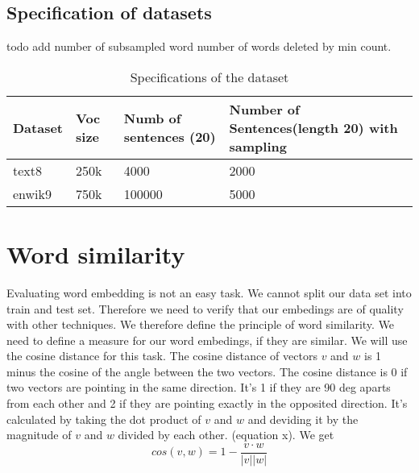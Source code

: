 \subsection{Specification of datasets}
todo add number of subsampled word number of words deleted by min count.
\begin{table}[]
\begin{tabular}{|l|l|l|l|}
\hline
Dataset & Voc size & Numb of sentences (20) & Number of Sentences(length 20) with sampling \\ \hline
text8   & 250k     & 4000                   & 2000                                         \\ \hline
enwik9  & 750k     & 100000                 & 5000                                         \\ \hline
\end{tabular}
\caption{Specifications of the dataset}
\end{table}

\section{Word similarity}
Evaluating word embedding is not an easy task. We cannot split our data set into train and test set. Therefore we need to verify that our embedings are of quality with other techniques. We therefore define the principle of word similarity. We need to define a measure for our word embedings, if they are similar. We will use the cosine distance for this task. The cosine distance of vectors $v$ and $w$ is 1 minus the cosine of the angle between the two vectors. The cosine distance is 0 if two vectors are pointing in the same direction. It's 1 if they are 90 deg aparts from each other and 2 if they are pointing exactly in the opposited direction. It's calculated by taking the dot product of $v$ and $w$ and deviding it by the magnitude of $v$ and $w$ divided by each other. (equation x). We get
\begin{equation}
cos(v,w) =1 - \frac{v \cdot w}{|v| |w|} 
\end{equation}


